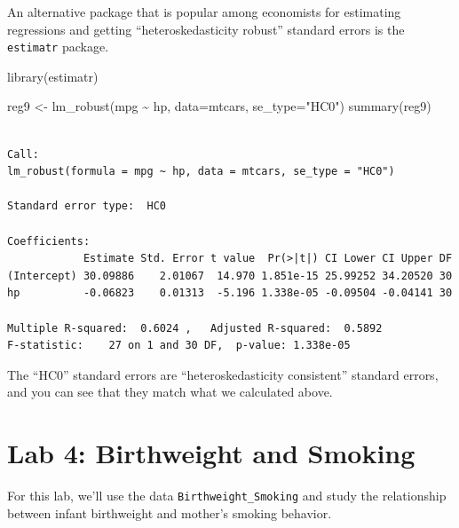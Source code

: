 \documentclass[
  letterpaper,
  DIV=11,
  numbers=noendperiod]{scrreprt}
\newenvironment{Shaded}{\begin{snugshade}}{\end{snugshade}}
\newcommand{\AttributeTok}[1]{\textcolor[rgb]{0.40,0.45,0.13}{#1}}
\newcommand{\FunctionTok}[1]{\textcolor[rgb]{0.28,0.35,0.67}{#1}}
\newcommand{\NormalTok}[1]{\textcolor[rgb]{0.00,0.23,0.31}{#1}}
\newcommand{\OtherTok}[1]{\textcolor[rgb]{0.00,0.23,0.31}{#1}}
\newcommand{\SpecialCharTok}[1]{\textcolor[rgb]{0.37,0.37,0.37}{#1}}
\newcommand{\StringTok}[1]{\textcolor[rgb]{0.13,0.47,0.30}{#1}}
\begin{document}
An alternative package that is popular among economists for estimating
regressions and getting ``heteroskedasticity robust'' standard errors is
the \texttt{estimatr} package.

\begin{Shaded}
\begin{Highlighting}[]
\FunctionTok{library}\NormalTok{(estimatr)}

\NormalTok{reg9 }\OtherTok{\textless{}{-}} \FunctionTok{lm\_robust}\NormalTok{(mpg }\SpecialCharTok{\textasciitilde{}}\NormalTok{ hp, }\AttributeTok{data=}\NormalTok{mtcars, }\AttributeTok{se\_type=}\StringTok{"HC0"}\NormalTok{)}
\FunctionTok{summary}\NormalTok{(reg9)}
\end{Highlighting}
\end{Shaded}

\begin{verbatim}

Call:
lm_robust(formula = mpg ~ hp, data = mtcars, se_type = "HC0")

Standard error type:  HC0 

Coefficients:
            Estimate Std. Error t value  Pr(>|t|) CI Lower CI Upper DF
(Intercept) 30.09886    2.01067  14.970 1.851e-15 25.99252 34.20520 30
hp          -0.06823    0.01313  -5.196 1.338e-05 -0.09504 -0.04141 30

Multiple R-squared:  0.6024 ,   Adjusted R-squared:  0.5892 
F-statistic:    27 on 1 and 30 DF,  p-value: 1.338e-05
\end{verbatim}

The ``HC0'' standard errors are ``heteroskedasticity consistent''
standard errors, and you can see that they match what we calculated
above.

\section{Lab 4: Birthweight and
Smoking}\label{lab-4-birthweight-and-smoking}

For this lab, we'll use the data \texttt{Birthweight\_Smoking} and study
the relationship between infant birthweight and mother's smoking
behavior.
\end{document}

